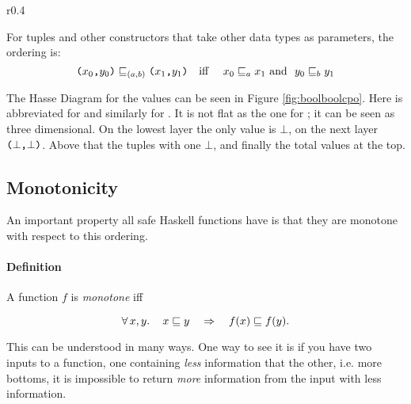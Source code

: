 \begin{wrapfigure}[25]{r}{0.4\textwidth} %
\begin{center}
\vspace{-30pt}

\caption{
    \texttt{(Bool,Bool)} order.
    \label{fig:boolboolcpo}
}
\end{center}
\end{wrapfigure} %
For tuples and other constructors that take other data types as
parameters, the ordering is:
\begin{equation*}
\texttt{(} x_0 \texttt{,} y_0 \texttt{)} \sqsubseteq_{(a,b)} \texttt{(} x_1 \texttt{,} y_1 \texttt{)} \text{\quad iff \quad}
x_0 \sqsubseteq_a x_1 \text{\,\,and \,\,} y_0 \sqsubseteq_b y_1
\end{equation*}

The Hasse Diagram for the  values can be seen in
Figure \ref{fig:boolboolcpo}. Here  is abbreviated for 
and similarly for . It is not flat as the one for ;
it can be seen as three dimensional. On the lowest layer the only
value is $\bot$, on the next layer $\texttt{(} \bot \texttt{,} \bot \texttt{)}$. Above that
the tuples with one $\bot$, and finally the total values at the
top.

\vspace{55pt}

\subsection{Monotonicity}
 An important property all safe Haskell functions have is that they are
monotone with respect to this ordering.

\paragraph{Definition} A function $f$ is \emph{monotone} iff

\begin{equation*}
\forall \, x , y . \, \quad x \sqsubseteq y \quad \Rightarrow \quad f(x) \sqsubseteq f(y).
\end{equation*}

This can be understood in many ways. One way to see it is if you have
two inputs to a function, one containing \emph{less} information that
the other, i.e. more bottoms, it is impossible to return \emph{more}
information from the input with less information.

